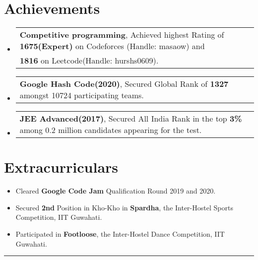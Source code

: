 \documentclass[a4paper,11pt]{article}
\makeatletter
\newcommand{\resumePOR}[3]{
\vspace{0.5mm}\item
    \begin{tabular*}{0.97\textwidth}[t]{l@{\extracolsep{\fill}}r}
        \textbf{#1},\hspace{0.3mm}#2 & \textit{\small{#3}} 
    \end{tabular*}
    \vspace{-2mm}
}
\newcommand{\resumeSubHeadingListStart}{\begin{itemize}[leftmargin=*,labelsep=0mm]}
\newcommand{\resumeSubHeadingListEnd}{\end{itemize}\vspace{2mm}}
\makeatother
\begin{document}
\vspace{-1.5mm}
\section{\textbf{Achievements}}
\vspace{-0.2mm}
\resumeSubHeadingListStart
\resumePOR{Competitive programming} %
    { Achieved highest Rating of \textbf{1675(Expert)} on Codeforces (Handle: masaow) and \\ \textbf{1816} on Leetcode(Handle: hurshs0609).} %
    { } %
\resumePOR{Google Hash Code(2020)} %
{ Secured Global Rank of \textbf{1327} amongst 10724 participating teams.} %
{ } %
\resumePOR{JEE Advanced(2017)} %
    { Secured All India Rank in the top \textbf{3\%} among 0.2 million candidates appearing for the test.} %
    {} %
\resumeSubHeadingListEnd
\vspace{-5.5mm}
\section{\textbf{Extracurriculars}}
\vspace{1mm}
\begin{itemize}[leftmargin=1em]  
    \item Cleared \textbf{Google Code Jam} Qualification Round 2019 and 2020.
\end{itemize} 
\vspace{-5mm}
\begin{itemize}[leftmargin=1em]  
    \item Secured \textbf{2nd} Position in Kho-Kho in \textbf{Spardha}, the Inter-Hostel Sports Competition, IIT Guwahati. 
\end{itemize}
\vspace{-5mm}

\begin{itemize}[leftmargin=1em]  
    \item Participated in \textbf{Footloose}, the Inter-Hostel Dance Competition, IIT Guwahati.
\end{itemize}
\vspace{-3mm}
\hspace*{-5mm}\rule{1.035\textwidth}{0.1mm}

\end{document}

